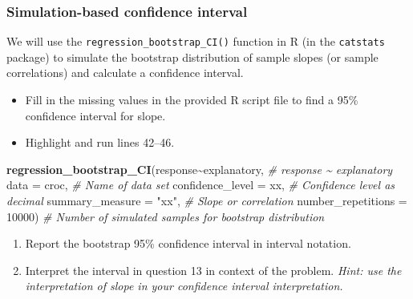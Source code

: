 \documentclass[
]{report}
\newenvironment{Shaded}{\begin{snugshade}}{\end{snugshade}}
\newcommand{\AttributeTok}[1]{\textcolor[rgb]{0.13,0.29,0.53}{#1}}
\newcommand{\CommentTok}[1]{\textcolor[rgb]{0.56,0.35,0.01}{\textit{#1}}}
\newcommand{\DecValTok}[1]{\textcolor[rgb]{0.00,0.00,0.81}{#1}}
\newcommand{\FunctionTok}[1]{\textcolor[rgb]{0.13,0.29,0.53}{\textbf{#1}}}
\newcommand{\NormalTok}[1]{#1}
\newcommand{\SpecialCharTok}[1]{\textcolor[rgb]{0.81,0.36,0.00}{\textbf{#1}}}
\newcommand{\StringTok}[1]{\textcolor[rgb]{0.31,0.60,0.02}{#1}}
\begin{document}
\subsubsection*{Simulation-based confidence interval}\label{simulation-based-confidence-interval-2}

We will use the \texttt{regression\_bootstrap\_CI()} function in R (in the \texttt{catstats} package) to simulate the bootstrap distribution of sample slopes (or sample correlations) and calculate a confidence interval.

\begin{itemize}
\item
  Fill in the missing values in the provided R script file to find a 95\% confidence interval for slope.
\item
  Highlight and run lines 42--46.
\end{itemize}

\begin{Shaded}
\begin{Highlighting}[]
\FunctionTok{regression\_bootstrap\_CI}\NormalTok{(response}\SpecialCharTok{\textasciitilde{}}\NormalTok{explanatory, }\CommentTok{\# response \textasciitilde{} explanatory}
   \AttributeTok{data =}\NormalTok{ croc, }\CommentTok{\# Name of data set}
   \AttributeTok{confidence\_level =}\NormalTok{ xx, }\CommentTok{\# Confidence level as decimal}
   \AttributeTok{summary\_measure =} \StringTok{"xx"}\NormalTok{, }\CommentTok{\# Slope or correlation}
   \AttributeTok{number\_repetitions =} \DecValTok{10000}\NormalTok{) }\CommentTok{\# Number of simulated samples for bootstrap distribution}
\end{Highlighting}
\end{Shaded}

\begin{enumerate}
\def\labelenumi{\arabic{enumi}.}
\setcounter{enumi}{12}
\item
  Report the bootstrap 95\% confidence interval in interval notation.\\
  \vspace{0.5in}
\item
  Interpret the interval in question 13 in context of the problem. \emph{Hint: use the interpretation of slope in your confidence interval interpretation.}
\end{enumerate}

\vspace{0.8in}
\end{document}
